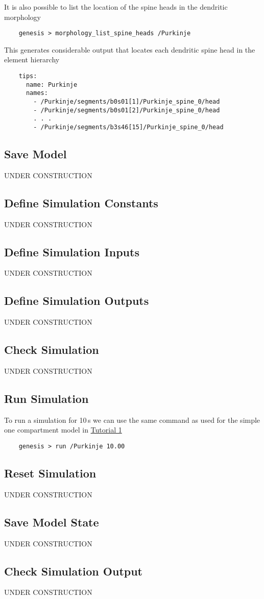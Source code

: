 \documentclass[12pt]{article}
\begin{document}
It is also possible to list the location of the spine heads in the dendritic morphology
\begin{verbatim}
    genesis > morphology_list_spine_heads /Purkinje
\end{verbatim}
This generates considerable output that locates each dendritic spine head in the element hierarchy
\begin{verbatim}
    tips:
      name: Purkinje
      names:
        - /Purkinje/segments/b0s01[1]/Purkinje_spine_0/head
        - /Purkinje/segments/b0s01[2]/Purkinje_spine_0/head
        . . .
        - /Purkinje/segments/b3s46[15]/Purkinje_spine_0/head
\end{verbatim}

\subsection*{Save Model}

UNDER CONSTRUCTION

\subsection*{Define Simulation Constants}

UNDER CONSTRUCTION

\subsection*{Define Simulation Inputs}

UNDER CONSTRUCTION

\subsection*{Define Simulation Outputs}

UNDER CONSTRUCTION

\subsection*{Check Simulation}

UNDER CONSTRUCTION

\subsection*{Run Simulation}

To run a simulation for 10\,s we can use the same command as used for the simple one compartment model in \href{../tutorial1/tutorial1.tex}{Tutorial 1}
\begin{verbatim}
    genesis > run /Purkinje 10.00
\end{verbatim}

\subsection*{Reset Simulation}

UNDER CONSTRUCTION

\subsection*{Save Model State}

UNDER CONSTRUCTION

\subsection*{Check Simulation Output}

UNDER CONSTRUCTION
\end{document}
